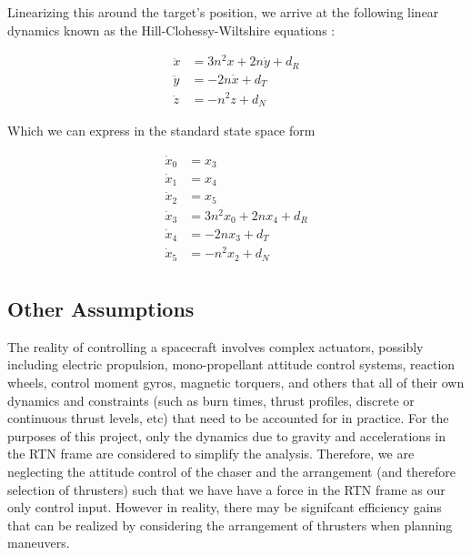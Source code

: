\documentclass[conference]{IEEEtran}
\begin{document}
Linearizing this around the target's position, we arrive at the
following linear dynamics known as the Hill-Clohessy-Wiltshire equations \cite{cli_clohessy_nodate}:

\begin{equation}
    \label{eq:linear-dynamics}
    \begin{split}
        \ddot{x} & = 3n^2 x + 2n\dot{y}  + d_R \\
        \ddot{y} & = -2n\dot{x} + d_T \\
        \ddot{z} & = -n^2z + d_N
    \end{split}
\end{equation}

Which we can express in the standard state space form

\begin{equation}
    \label{eq:linear-dynamics-state-space}
    \begin{split}
        \dot{x}_0 &= x_3 \\
        \dot{x}_1 &= x_4 \\
        \dot{x}_2 &= x_5 \\
        \dot{x}_3 &= 3n^2x_0 + 2n x_4 + d_R\\
        \dot{x}_4 &= -2nx_3 + d_T \\
        \dot{x}_5 &= -n^2x_2 + d_N \\
    \end{split}
\end{equation}


\subsection{Other Assumptions}

The reality of controlling a spacecraft involves complex actuators, possibly including
electric propulsion, mono-propellant attitude control systems, reaction wheels,
control moment gyros, magnetic torquers, and others that all of their own
dynamics and constraints (such as burn times, thrust profiles, discrete or
continuous thrust levels, etc) that need
to be accounted for in practice. For the purposes of this
project, only the dynamics due to gravity and accelerations in the RTN frame
are considered to simplify the analysis. Therefore, we are neglecting the
attitude control of the chaser and the arrangement (and therefore selection of
thrusters) such that we have have a force in the RTN frame as our only control
input. However in reality, there may be signifcant efficiency gains that can be
realized by considering the arrangement of thrusters when planning maneuvers.
\end{document}
